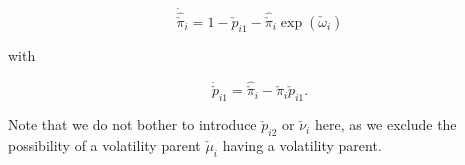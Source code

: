 \begin{equation}
	\dot{\hat{\check{\pi}}}_i = 1 - \check{p}_{i1} - \hat{\check{\pi}}_i \exp(\check{\omega}_i)
\end{equation}

with

\begin{equation}
	\dot{\check{p}}_{i1} = \hat{\check{\pi}}_i - \check{\pi}_i \check{p}_{i1}. 
\end{equation}

Note that we do not bother to introduce $\check{p}_{i2}$ or $\check{\nu}_i$ here, as we exclude the possibility of a volatility parent $\check{\mu}_i$ having a volatility parent.
